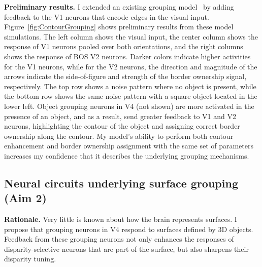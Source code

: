 \documentclass[11pt,notitlepage]{article}
\begin{document}
\textbf{Preliminary results.} I extended an existing grouping model~\citep{Mihalas_etal11b} by adding feedback to the V1 neurons that encode edges in the visual input. Figure~\ref{fig:ContourGrouping} shows preliminary results from these model simulations. 
The left column shows the visual
input, the center column shows the response of V1 neurons pooled
over both orientations, and the right columns shows the response of BOS V2 neurons. Darker colors indicate higher activities for the V1 neurons, while for the V2 neurons, the direction and magnitude of the arrows indicate the side-of-figure and strength of the border ownership signal, respectively.
The top row shows a noise pattern where no object is
present, while the bottom row shows the same noise pattern with a
square object located in the lower left. Object grouping neurons in V4
(not shown)
are more activated in the presence of an object, and as a result, send
greater feedback to V1 and V2 neurons, highlighting the contour of the
object and assigning correct border ownership along the contour.
My model's ability to perform both contour enhancement and border ownership assignment with the same set of parameters increases my confidence that it describes the underlying grouping mechanisms.


\subsection{Neural circuits underlying surface grouping (Aim 2)} 
\textbf{Rationale.} Very little is known about how the brain 
represents
surfaces.
I propose that
grouping neurons in V4 respond to surfaces defined by 3D
objects. Feedback from these grouping neurons not only enhances the
responses of disparity-selective neurons that are part of the surface,
but also sharpens their disparity tuning.
 
\end{document}
